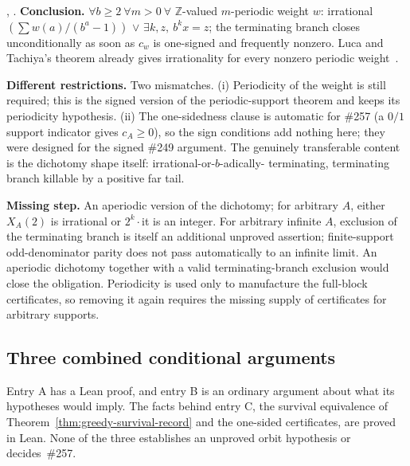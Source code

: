 \begin{obs}
,
.
\textbf{Conclusion.} $\forall b\ge2\ \forall m{>}0\ \forall$ $\mathbb Z$-valued $m$-periodic weight
$w$: irrational$(\sum w(a)/(b^a-1))$ $\vee$ $\exists k,z,\ b^k x=z$; the terminating branch closes
unconditionally as soon as $c_w$ is one-signed and frequently nonzero.
Luca and Tachiya's theorem already gives irrationality for every nonzero periodic
weight~\cite[Theorem~A, p.~139]{lucatachiya2017}.

\par\medskip

\textbf{Different restrictions.} Two mismatches. (i) Periodicity of the weight is still
required; this is the signed version of the periodic-support theorem and keeps its periodicity hypothesis.
(ii) The one-sidedness clause is automatic for \#257 (a $0/1$ support indicator gives
$c_{A}\ge0$), so the sign conditions add nothing here; they were designed for the signed
\#249 argument.
The genuinely transferable content is the dichotomy shape itself: irrational-or-$b$-adically-
terminating, terminating branch killable by a positive far tail.

\par\medskip

\textbf{Missing step.} An aperiodic version of the dichotomy; for arbitrary $A$, either
$X_{A}(2)$ is irrational or $2^k\cdot$it is an integer. For arbitrary infinite $A$, exclusion of the terminating branch is itself an additional unproved
assertion; finite-support odd-denominator parity does not pass automatically to an infinite limit.
An aperiodic dichotomy together with a valid terminating-branch exclusion would close the
obligation. Periodicity is used only to manufacture the full-block certificates,
so removing it again requires the missing supply of certificates for arbitrary supports.
\end{obs}

\subsection{Three combined conditional arguments}

Entry A has a Lean proof, and entry B is an ordinary argument about what
its hypotheses would imply.  The facts behind entry C, the survival equivalence of
Theorem~\ref{thm:greedy-survival-record} and the one-sided certificates,
are proved in Lean.  None of the three establishes an unproved orbit
hypothesis or decides~\#257.

